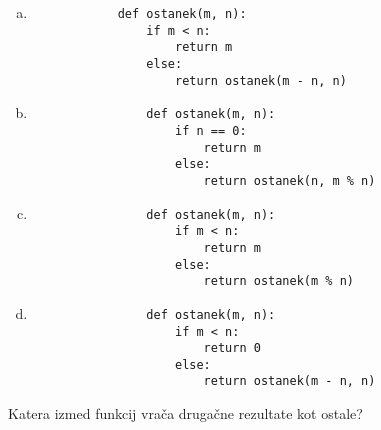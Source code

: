 \documentclass[arhiv, 10pt]{../izpit}
\begin{document}
        \begin{multicols}{2}
        \begin{enumerate}[(a)]
\item 
            \begin{verbatim}
            def ostanek(m, n):
                if m < n:
                    return m
                else:
                    return ostanek(m - n, n)
            \end{verbatim}
        
\item 
                \begin{verbatim}
                def ostanek(m, n):
                    if n == 0:
                        return m
                    else:
                        return ostanek(n, m % n)
                \end{verbatim}
            
\item 
                \begin{verbatim}
                def ostanek(m, n):
                    if m < n:
                        return m
                    else:
                        return ostanek(m % n)
                \end{verbatim}
            
\item 
                \begin{verbatim}
                def ostanek(m, n):
                    if m < n:
                        return 0
                    else:
                        return ostanek(m - n, n)
                \end{verbatim}
            
\end{enumerate}

        \end{multicols}
    
        \naloga*
        
        Katera izmed funkcij vrača drugačne rezultate kot ostale?
    
\end{document}
